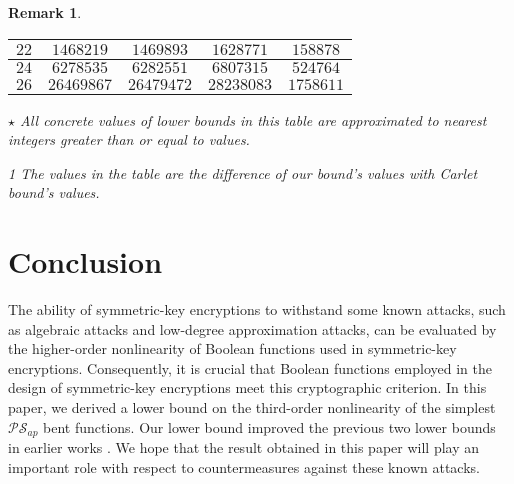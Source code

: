 \documentclass{article}
\newcommand{\0}{\textbf{0}}
\newcommand{\1}{\textbf{1}}
\theoremstyle{plain}
\newtheorem{remark}{Remark}
\begin{document}
\begin{remark}
\begin{table}
\begin{threeparttable}
\begin{tabular}{|c|c|c|c|c|}
                    $22 $ &  $ 1468219     $       & $ 1469893  $     & $ 1628771  $     & $  158878  $ \\  \hline
                    $24 $ &  $ 6278535     $       & $ 6282551  $     & $ 6807315  $     & $  524764  $ \\  \hline
                    $26 $ &  $ 26469867    $       & $ 26479472 $     & $ 28238083 $     & $  1758611 $ \\  \hline
                \end{tabular}
                \begin{tablenotes}
                    \footnotesize
                    \item[$\star$] All concrete values of lower bounds in this table are approximated to nearest  integers greater than or equal to values.
                    \item[1] The values in the table are the difference of our bound's values with  Carlet bound's values.
                \end{tablenotes}
            \end{threeparttable}
            \label{table:MyTableLabel}
        \end{table}
    \end{remark}


\section{Conclusion}
    The ability of symmetric-key encryptions to withstand some known attacks, such as algebraic attacks and low-degree approximation attacks, can be evaluated by the higher-order nonlinearity of Boolean functions used in symmetric-key encryptions.
    Consequently, it is crucial that Boolean functions employed in the design of symmetric-key encryptions meet this cryptographic criterion.
    In this paper, we derived a lower bound on the third-order nonlinearity of the simplest $\mathcal{PS}_{ap}$ bent functions.
    Our lower bound improved the previous two lower bounds in earlier works \cite{TangCT2013NL_2bent,Carlet2011NL_Profile_Dillon}.
    We hope that the result obtained in this paper will play an important role with respect to countermeasures against these known attacks.



\end{document}
